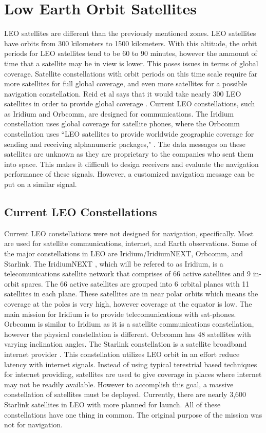\documentclass[12pt]{report}
\begin{document}
\section{Low Earth Orbit Satellites}
LEO satellites are different than the previously mentioned zones. LEO satellites have orbits from 300 kilometers to 1500 kilometers. With this altitude, the orbit periods for LEO satellites tend to be 60 to 90 minutes, however the ammount of time that a satellite may be in view is lower. This poses issues in terms of global coverage. Satellite constellations with orbit periods on this time scale require far more satellites for full global coverage, and even more satellites for a possible navigation constellation. Reid et al says that it would take nearly 300 LEO satellites in order to provide global coverage \cite{reidSatelliteNavigationAge2020}. 
Current LEO constellations, such as Iridium and Orbcomm, are designed for communications. The Iridium constellation uses global coverage for satellite phones, where the Orbcomm constellation uses ``LEO satellites to provide worldwide geographic coverage for sending and receiving alphanumeric packages," \cite{orabiOpportunisticNavigationDoppler2021}. The data messages on these satellites are unknown as they are proprietary to the companies who sent them into space. This makes it difficult to design receivers and evaluate the navigation performance of these signals. However, a customized navigation message can be put on a similar signal. 

\subsection{Current LEO Constellations}
Current LEO constellations were not designed for navigation, specifically. Most are used for satellite communications, internet, and Earth observations. Some of the major constellations in LEO are Iridium/IridiumNEXT, Orbcomm, and Starlink. The IridiumNEXT \cite{IridiumNEXTReview2019}, which will be refered to as Iridium, is a telecomunications satellite network that comprises of 66 active satellites and 9 in-orbit spares. The 66 active satellites are grouped into 6 orbital planes with 11 satellites in each plane. These satellites are in near polar orbits which means the coverage at the poles is very high, however coverage at the equator is low. The main mission for Iridium is to provide telecomunications with sat-phones. Orbcomm is similar to Iridium as it is a satellite communications constellation, however the physical constellation is different. Orbcomm has 48 satellites with varying inclination angles. The Starlink constellation is a satellite broadband internet provider \cite{Starlink}. This constellation utilizes LEO orbit in an effort reduce latency with internet signals. Instead of using typical terestrial based techniques for internet providing, satellites are used to give coverage in places where internet may not be readily available. However to accomplish this goal, a massive constellation of satellites must be deployed. Currently, there are nearly 3,600 Starlink satellites in LEO with more planned for launch. All of these constellations have one thing in common. The original purpose of the mission was not for navigation. 
\end{document}
